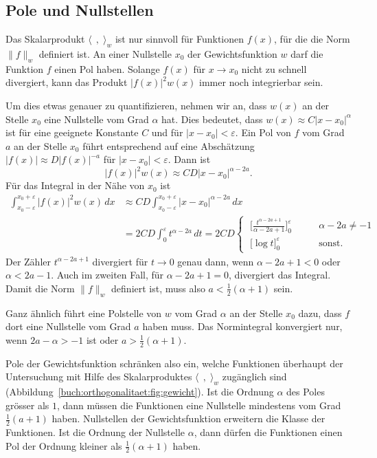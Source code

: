 \subsection{Pole und Nullstellen
\label{buch:orthogonal:pole-und-nullstellen}}
Das Skalarprodukt $\langle\,\;,\;\rangle_w$ ist nur sinnvoll
für Funktionen $f(x)$, für die die Norm $\|f\|_w$ definiert ist.
An einer Nullstelle $x_0$ der Gewichtsfunktion $w$ darf die Funktion $f$ 
einen Pol haben. 
Solange $f(x)$ für $x\to x_0$ nicht zu schnell divergiert, kann
das Produkt $|f(x)|^2 w(x)$ immer noch integrierbar sein.


Um dies etwas genauer zu quantifizieren, nehmen wir an, dass
$w(x)$ an der Stelle $x_0$ eine Nullstelle vom Grad $\alpha$ hat.
Dies bedeutet, dass $w(x) \approx C|x-x_0|^\alpha$ ist für eine geeignete
Konstante $C$ und für $|x-x_0|<\varepsilon$.
Ein Pol von $f$ vom Grad $a$ an der Stelle $x_0$ führt entsprechend auf
eine Abschätzung $|f(x)| \approx D|f(x)|^{-a}$ für $|x-x_0|<\varepsilon$.
Dann ist
\[
|f(x)|^2 w(x) \approx CD |x-x_0|^{\alpha-2a}.
\]
Für das Integral in der Nähe von $x_0$ ist
\begin{align*}
\int_{x_0-\varepsilon}^{x_0+\varepsilon}
|f(x)|^2 w(x)\,dx
&\approx 
CD
\int_{x_0-\varepsilon}^{x_0+\varepsilon}
|x-x_0|^{\alpha-2a}\,dx
\\
&=
2CD
\int_0^\varepsilon
t^{\alpha-2a}
\,dt
=
2CD
\begin{cases}
\displaystyle
\;
\biggl[\frac{t^{\alpha-2a+1}}{\alpha-2a+1}\biggr]_0^\varepsilon
&\qquad
\alpha-2a\ne-1
\\[7pt]
\displaystyle
\;
\biggl[ \log t \biggr]_0^\varepsilon
&\qquad
\text{sonst.}
\end{cases}
\end{align*}
Der Zähler $t^{\alpha-2a+1}$ divergiert für $t\to 0$ genau dann,
wenn $\alpha-2a+1<0$ oder $\alpha<2a-1$.
Auch im zweiten Fall, für $\alpha-2a+1=0$, divergiert das Integral.
Damit die Norm $\|f\|_w$ definiert ist, muss also $a<\frac12(\alpha+1)$
sein.

Ganz ähnlich führt eine Polstelle von $w$ vom Grad $\alpha$
an der Stelle $x_0$ dazu, dass $f$ dort eine Nullstelle vom Grad
$a$ haben muss.
Das Normintegral konvergiert nur, wenn $2a-\alpha > -1$ ist
oder $a > \frac12(\alpha+1)$.
 
Pole der Gewichtsfunktion schränken also ein, welche Funktionen
überhaupt der Untersuchung mit Hilfe des Skalarproduktes
$\langle\,\;,\;\rangle_w$ zugänglich sind
(Abbildung~\ref{buch:orthogonalitaet:fig:gewicht}).
Ist die Ordnung $\alpha$ des Poles grösser als $1$, dann müssen die Funktionen
eine Nullstelle mindestens vom Grad $\frac12(a+1)$ haben.
Nullstellen der Gewichtsfunktion erweitern die Klasse der Funktionen.
Ist die Ordnung der Nullstelle $\alpha$, dann dürfen die Funktionen einen
Pol der Ordnung kleiner als $\frac12(\alpha+1)$ haben.


